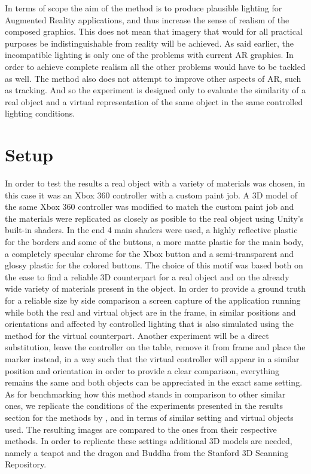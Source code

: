 
 In terms of scope the aim of the method is to produce plausible lighting for Augmented Reality applications, and thus increase the sense of realism of the composed graphics. This does not mean that imagery that would for all practical purposes be indistinguishable from reality will be achieved. As said earlier, the incompatible lighting is only one of the problems with current AR graphics. In order to achieve complete realism all the other problems would have to be tackled as well. The method also does not attempt to improve other aspects of AR, such as tracking. And so the experiment is designed only to evaluate the similarity of a real object and a virtual representation of the same object in the same controlled lighting conditions.\newline
\section{Setup}
In order to test the results a real object with a variety of materials was chosen, in this case it was an Xbox 360 controller with a custom paint job. A 3D model of the same Xbox 360 controller was modified to match the custom paint job and the materials were replicated as closely as posible to the real object using Unity's built-in shaders. In the end 4 main shaders were used, a highly reflective plastic for the borders and some of the buttons, a more matte plastic for the main body, a completely specular chrome for the Xbox button and a semi-transparent and glossy plastic for the colored buttons. The choice of this motif was based both on the ease to find a reliable 3D counterpart for a real object and on the already wide variety of materials present in the object.\newline
In order to provide a ground truth for a reliable size by side comparison a screen capture of the application running while both the real and virtual object are in the frame, in similar positions and orientations and affected by controlled lighting that is also simulated using the method for the virtual counterpart. Another experiment will be a direct substitution, leave the controller on the table, remove it from frame and place the marker instead, in a way such that the virtual controller will appear in a similar position and orientation in order to provide a clear comparison, everything remains the same and both objects can be appreciated in the exact same setting.\newline
As for benchmarking how this method stands in comparison to other similar ones, we replicate the conditions of the experiments presented in the results section for the methods by \cite{kanbara2004}, \cite{karsh2014} and \cite{pessoa2011} in terms of similar setting and virtual objects used. The resulting images are compared to the ones from their respective methods. In order to replicate these settings additional 3D models are needed, namely a teapot and the dragon and Buddha from the Stanford 3D Scanning Repository.\newline
